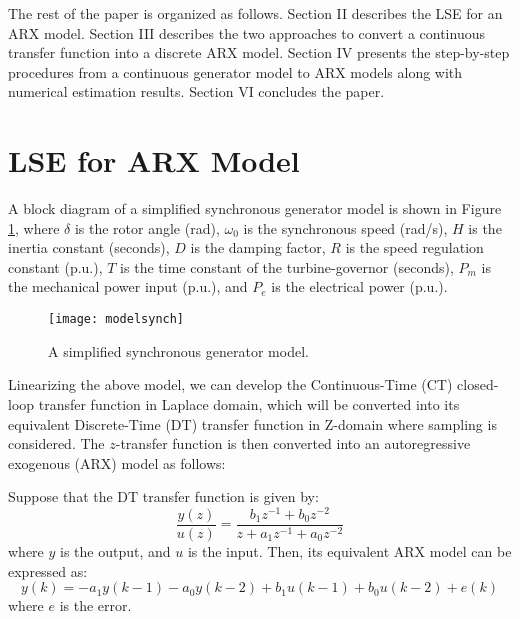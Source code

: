 \documentclass[10pt,journal,final]{IEEEtran}
\begin{document}
The rest of the paper is organized as follows. Section II describes the LSE for an ARX model. Section III describes the two approaches to convert a continuous transfer function into a discrete ARX model. Section IV presents the step-by-step procedures from a continuous generator model to ARX models along with numerical estimation results. Section VI concludes the paper.






\section{LSE for ARX Model}\label{method}
A block diagram of a simplified synchronous generator model is shown in Figure \ref{fig:sys}, where $\delta$ is the rotor angle (rad), $\omega_{0}$ is the synchronous speed (rad/s), {$H$ is the inertia constant (seconds), $D$ is the damping factor, $R$ is the speed regulation constant (p.u.), $T$ is the time constant of the turbine-governor (seconds),} $P_{m}$ is the mechanical power input (p.u.), and $P_{e}$  is the electrical power (p.u.).
\begin{figure}[h!]
\centering
\texttt{[image: modelsynch]}
\caption{A simplified synchronous generator model.} \label{fig:sys}
\end{figure}

Linearizing the above model, we can develop the Continuous-Time (CT) closed-loop transfer function in Laplace domain, which will be converted into its equivalent Discrete-Time (DT) transfer function in  Z-domain where sampling is considered. The $z$-{transfer} function is then converted into an autoregressive exogenous (ARX) model as follows:

Suppose that the DT transfer function is given by:
\begin{equation}
\frac{y(z)}{u(z)}=\frac{b_{1}z^{-1}+b_{0}z^{-2}}{z+a_{1}z^{-1}+a_{0}z^{-2}}
\end{equation}
where $y$ is the output, and $u$ is the input. Then, its equivalent ARX model can be expressed as:
\begin{equation}\label{ARXX}
y(k)=-a_{1}y(k-1)-a_{0}y(k-2)+b_{1}u(k-1)+b_{0}u(k-2) +e(k)
\end{equation}
where $e$ is the error.
\end{document}
